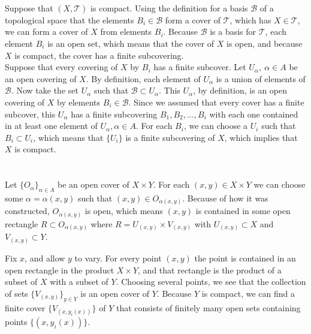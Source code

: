 \documentclass{jhwhw}
\newcommand{\T}{{\mathcal T}}
\newcommand{\B}{{\mathcal B}}
\begin{document}
\part{}%

Suppose that $(X,\T)$ is compact. Using the definition for a basis $\B$ of a topological space that the elements $B_i \in \B$ form a cover of $\T$, which has $X \in \T$, we can form a cover of $X$ from elements $B_i$. Because $\B$ is a basis for $\T$, each element $B_i$ is an open set, which means that the cover of $X$ is open, and because $X$ is compact, the cover has a finite subcovering.
\\

Suppose that every covering of $X$ by $B_i$ has a finite subcover. Let  $U_{\alpha}, \ \alpha \in A$ be an open covering of $X$.  By definition, each element of $U_{\alpha}$ is a union of elements of $\B$. Now take the set $U_{\alpha}$ such that $\B \subset U_{\alpha}$. This $U_{\alpha}$, by definition, is an open covering of $X$ by elements $B_i \in \B$.  Since we assumed that every cover has a finite subcover, this $U_{\alpha}$ has a finite subcovering $B_1,B_2, \dots, B_i$ with each one contained in at least one element of $U_{\alpha}, \alpha \in A$. For each $B_i$, we can choose a $U_i$ such that $B_i \subset U_i$, which means that $\{U_i\}$ is a finite subcovering of $X$, which implies that $X$ is compact.

\part{}%

Let $\{O_{\alpha}\}_{\alpha \in A}$ be an open cover of $X \times Y$. For each $(x,y) \in X\times Y$ we can choose some $\alpha=\alpha(x,y)$ such that $(x,y) \in O_{\alpha(x,y)}$. Because of how it was constructed, $O_{\alpha(x,y)}$ is open, which means $(x,y)$ is contained in some open rectangle $R \subset O_{\alpha(x,y)}$ where $R = U_{(x,y)} \times V_{(x,y)}$ with $U_{(x,y)} \subset X$ and $V_{(x,y)} \subset Y$.  


Fix $x$, and allow $y$ to vary. For every point $(x,y)$ the point is contained in an open rectangle in the product $X \times Y$, and that rectangle is the product of a subset of $X$ with a subset of $Y$. Choosing several points, we see that the collection of sets $\{V_{(x,y)}\}_{y \in Y}$ is an open cover of $Y$. Because $Y$ is compact, we can find a finite cover $\{V_{(x,y_i(x))}\}$ of $Y$ that consists of finitely many open sets containing points $\{(x,y_i(x))\}$.
\end{document}
